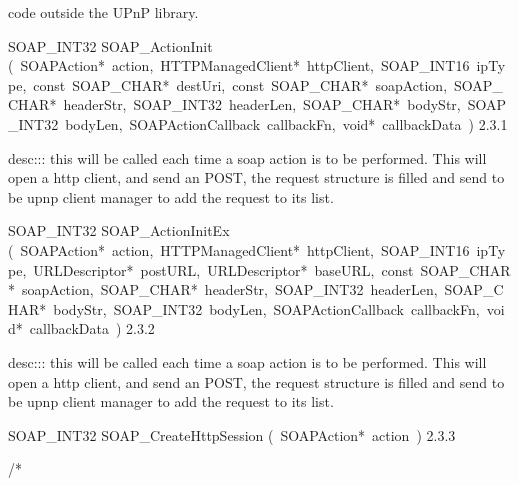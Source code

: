 \documentclass{article}
\begin{document}
\begin{cxxentry}
\begin{cxxentry}
\begin{cxxdoc}
code outside the UPnP library. 
\end{cxxdoc}
\begin{cxxfunction}
{SOAP\_INT32}
        {SOAP\_ActionInit}
        {(\ SOAPAction*\ action,\ HTTPManagedClient*\ httpClient,\ SOAP\_INT16\ ipType,\ const\ SOAP\_CHAR*\ destUri,\ const\ SOAP\_CHAR*\ soapAction,\ SOAP\_CHAR*\ headerStr,\ SOAP\_INT32\ headerLen,\ SOAP\_CHAR*\ bodyStr,\ SOAP\_INT32\ bodyLen,\ SOAPActionCallback\ callbackFn,\ void*\ callbackData\ )}
        {}
        {2.3.1}
\begin{cxxdoc}
desc::: this will be called each time a soap action is to be performed. This will
open a http client, and send an POST, the request structure is filled and
send to be upnp client manager to add the request to its list.


\end{cxxdoc}
\end{cxxfunction}
\begin{cxxfunction}
{SOAP\_INT32}
        {SOAP\_ActionInitEx}
        {(\ SOAPAction*\ action,\ HTTPManagedClient*\ httpClient,\ SOAP\_INT16\ ipType,\ URLDescriptor*\ postURL,\ URLDescriptor*\ baseURL,\ const\ SOAP\_CHAR*\ soapAction,\ SOAP\_CHAR*\ headerStr,\ SOAP\_INT32\ headerLen,\ SOAP\_CHAR*\ bodyStr,\ SOAP\_INT32\ bodyLen,\ SOAPActionCallback\ callbackFn,\ void*\ callbackData\ )}
        {}
        {2.3.2}
\begin{cxxdoc}
desc::: this will be called each time a soap action is to be performed. This will
open a http client, and send an POST, the request structure is filled and
send to be upnp client manager to add the request to its list.


\end{cxxdoc}
\end{cxxfunction}
\begin{cxxfunction}
{SOAP\_INT32}
        {SOAP\_CreateHttpSession}
        {(\ SOAPAction*\ action\ )}
        {}
        {2.3.3}
\begin{cxxdoc}
/*


\end{cxxdoc}
\end{cxxfunction}
\end{cxxentry}
\end{cxxentry}
\end{document}
